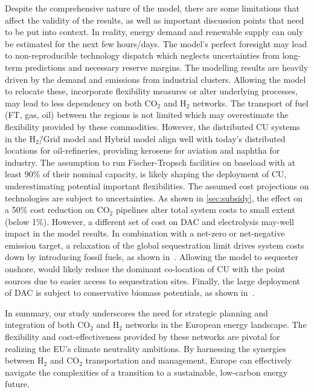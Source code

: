\documentclass[twocolumn]{article}
\newcommand{\COtwo}{CO$_2$}
\newcommand{\Htwo}{H$_2$}
\newcommand{\carbon}{CO$_2$}
\newcommand{\hydrogenmodel}{H$_2$\=/Grid model}
\newcommand{\hybridmodel}{Hybrid model}
\begin{document}
Despite the comprehensive nature of the model, there are some limitations that affect the validity of the results, as well as important discussion points that need to be put into context.
In reality, energy demand and renewable supply can only be estimated for the next few hours/days. The model's perfect foresight may lead to non-reproducible technology dispatch which neglects uncertainties from long-term predictions and necessary reserve margins.
The modelling results are heavily driven by the demand and emissions from industrial clusters. Allowing the model to relocate these, incorporate flexibility measures or alter underlying processes, may lead to less dependency on both \COtwo{} and \Htwo{} networks.
The transport of fuel (FT, gas, oil) between the regions is not limited which may overestimate the flexibility provided by these commodities. However, the distributed CU systems in the \hydrogenmodel{} and \hybridmodel{} align well with today's distributed locations for oil-refineries, providing kerosene for aviation and naphtha for industry. The assumption to run Fischer-Tropsch facilities on baseload with at least 90\% of their nominal capacity, is likely shaping the deployment of CU, underestimating potential important flexibilities.
The assumed cost projections on technologies are subject to uncertainties. As shown in \ref{sec:subsidy}, the effect on a 50\% cost reduction on \carbon{} pipelines alter total system costs to small extent (below 1\%). However, a different set of cost on DAC and electrolysis may-well impact in the model results.
In combination with a net-zero or net-negative emission target, a relaxation of the global sequestration limit drives system costs down by introducing fossil fuels, as shown in~\cite{hofmannDesigningCO2Network2023}. Allowing the model to sequester onshore, would likely reduce the dominant co-location of CU with the point sources due to easier access to sequestration sites.
Finally, the large deployment of DAC is subject to conservative biomass potentials, as shown in~\cite{lauerCrucialRoleBioenergy2023}.

In summary, our study underscores the need for strategic planning and integration of both \COtwo{} and \Htwo{} networks in the European energy landscape. The flexibility and cost-effectiveness provided by these networks are pivotal for realizing the EU's climate neutrality ambitions. By harnessing the synergies between \Htwo{} and \COtwo{} transportation and management, Europe can effectively navigate the complexities of a transition to a sustainable, low-carbon energy future.
\end{document}
